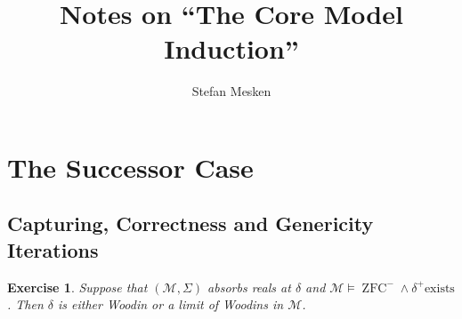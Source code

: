 \documentclass[12pt,a4paper]{article}
\theoremstyle{nicestyle}
\newtheorem{exercise}[theorem]{Exercise}
\DeclareMathOperator{\zfc}{ZFC}
\begin{document}
\author{Stefan Mesken}
\title{Notes on ``The Core Model Induction''}
\maketitle

\section{The Successor Case}

\setcounter{subsection}{3}
\subsection{Capturing, Correctness and Genericity Iterations}

\setcounter{theorem}{4}
\begin{exercise}
  Suppose that $(\mathcal{M}, \Sigma)$ absorbs reals at $\delta$ and
  $\mathcal{M} \models \zfc^{-} \wedge \delta^{+} \text{
    exists}$. Then $\delta$ is either Woodin or a limit of Woodins in
  $\mathcal{M}$.
\end{exercise}
\end{document}
